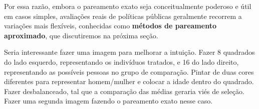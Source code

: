 Por essa razão, embora o pareamento exato seja conceitualmente poderoso e útil em casos simples, avaliações reais de políticas públicas geralmente recorrem a variações mais flexíveis, conhecidas como \textbf{métodos de pareamento aproximado}, que discutiremos na próxima seção.

\color{red}

Seria interessante fazer uma imagem para melhorar a intuição. Fazer 8 quadrados do lado esquerdo, representando os indivíduos tratados, e 16 do lado direito, representando as possíveis pessoas no grupo de comparação. Pintar de duas cores diferentes para representar homem/mulher e colocar a idade dentro do quadrado. Fazer desbalanceado, tal que a comparação das médias geraria viés de seleção. Fazer uma segunda imagem fazendo o pareamento exato nesse caso.

\color{black}